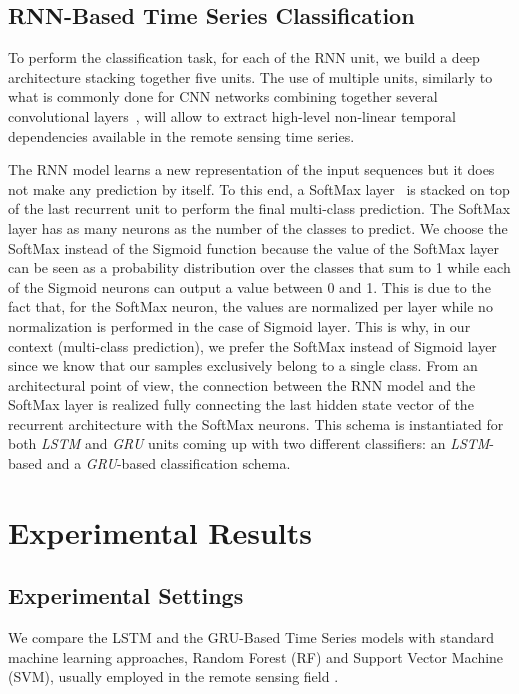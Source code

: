 \documentclass[journal, onecolumn]{IEEEtran}
\begin{document}
\subsection{RNN-Based Time Series Classification\label{sec:IRF-3} }
To perform the classification task, for each of the RNN unit, we build a deep architecture stacking together five units. The use of multiple units, similarly to what is commonly done for CNN networks combining together several convolutional layers~\cite{BengioCV13}, will allow to extract high-level non-linear temporal dependencies available in the remote sensing time series.


The RNN model learns a new representation of the input sequences but it does not make any prediction by itself. To this end, a SoftMax layer~\cite{Graves13} is stacked on top of the last recurrent unit to perform the final multi-class prediction. %
The SoftMax layer has as many neurons as the number of the classes to predict. We choose the SoftMax instead of the Sigmoid function because the value of the SoftMax layer can be seen as a probability distribution over the classes that sum to 1 while each of the Sigmoid neurons can output a value between 0 and 1. This is due to the fact that, for the SoftMax neuron, the values are normalized per layer while no normalization is performed in the case of Sigmoid layer. This is why, in our context (multi-class prediction), we prefer the SoftMax instead of Sigmoid layer since we know that our samples exclusively belong to a single class.
From an architectural point of view, the connection between the RNN model and the SoftMax layer is realized fully connecting the last hidden state vector of the recurrent architecture with the SoftMax neurons. This schema is instantiated for both \textit{LSTM} and \textit{GRU} units coming up with two different classifiers: an \textit{LSTM}-based and a \textit{GRU}-based classification schema.




\section{Experimental Results\label{sec:Results}}


\subsection{Experimental Settings }
We compare the LSTM and the GRU-Based Time Series models with standard machine learning approaches,  Random Forest (RF) and Support Vector Machine (SVM), usually employed in the remote sensing field \cite{Flamary15}. 
\end{document}

